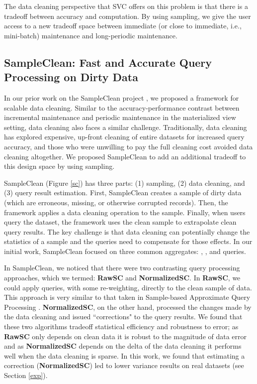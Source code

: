 The data cleaning perspective that SVC offers on this problem is that there is a tradeoff between accuracy and computation.
By using sampling, we give the user access to a new tradeoff space between immediate (or close to immediate, i.e., mini-batch) maintenance and long-periodic maintenance.

\subsection{SampleClean: Fast and Accurate Query Processing on Dirty Data}
In our prior work on the SampleClean project \cite{wang1999sample}, we proposed a framework for scalable data cleaning.
Similar to the accuracy-performance contrast between incremental maintenance and periodic maintenance in the materialized view setting, data cleaning also faces a similar challenge.
Traditionally, data cleaning has explored expensive, up-front cleaning of entire datasets for increased query accuracy, and those who were unwilling to pay the full cleaning cost avoided data cleaning altogether.
We proposed SampleClean to add an additional tradeoff to this design space by using sampling.

SampleClean (Figure \ref{sc}) has three parts: (1) sampling, (2) data cleaning, and (3) query result estimation.
First, SampleClean creates a sample of dirty data (which are erroneous, missing, or otherwise corrupted records).
Then, the framework applies a data cleaning operation to the sample.
Finally, when users query the dataset, the framework uses the clean sample to extrapolate clean query results.
The key challenge is that data cleaning can potentially change the statistics of a sample and the queries need to compensate for those effects.
In our initial work, SampleClean focused on three common aggregates: \sumfunc, \avgfunc, and \countfunc queries.

In SampleClean, we noticed that there were two contrasting query processing approaches, which we termed: \textbf{RawSC}  and \textbf{NormalizedSC}.
In \textbf{RawSC}, we could apply queries, with some re-weighting, directly to the clean sample of data.
This approach is very similar to that taken in Sample-based Approximate Query Processing \cite{OlkenR86,AgarwalMPMMS13, joshi2008materialized}.
\textbf{NormalizedSC}, on the other hand, processed the changes made by the data cleaning and issued ``corrections" to the query results.
We found that these two algorithms tradeoff statistical efficiency and robustness to error; as \textbf{RawSC} only depends on clean data it is robust to the magnitude of data error and as \textbf{NormalizedSC} depends on the delta of the data cleaning it performs well when the data cleaning is sparse. 
In this work, we found that estimating a correction (\textbf{NormalizedSC}) led to lower variance results on real datasets (see Section \ref{exp}). 

